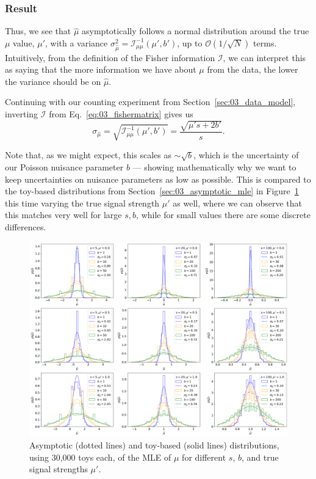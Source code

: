 \subsubsection{Result}
\label{sec:03_pmle_result}

Thus, we see that $\hat \mu$ asymptotically follows a normal distribution around the true $\mu$ value, $\mu'$, with a variance $\sigma_{\hat\mu}^2 = \mathcal I^{-1}_{\mu\mu}(\mu', b')$, up to $\mathcal O (1/\sqrt{N})$ terms.
Intuitively, from the definition of the Fisher information $\mathcal I$, we can interpret this as saying that the more information we have about $\mu$ from the data, the lower the variance should be on $\hat \mu$.

Continuing with our counting experiment from Section~\ref{sec:03_data_model}, inverting $\mathcal I$ from Eq.~\ref{eq:03_fishermatrix} gives us
\begin{equation}
    \sigma_{\hat\mu} = \sqrt{\mathcal I^{-1}_{\mu\mu}(\mu', b')} = \frac{\sqrt{\mu' s + 2b'}}{s}.
\label{eq:03_asymstd}
\end{equation}

Note that, as we might expect, this scales as $\sim \sqrt{b}$, which is the uncertainty of our Poisson nuisance parameter $b$ --- showing mathematically why we want to keep uncertainties on nuisance parameters as low as possible.
This is compared to the toy-based distributions from Section~\ref{sec:03_asymptotic_mle} in Figure~\ref{fig:03_p_mle_asym} this time varying the true signal strength $\mu'$ as well, where we can observe that this matches very well for large $s, b$, while for small values there are some discrete differences. 

\begin{figure}[htb]
\centering
\includegraphics[width=\textwidth]{figures/03-Stats/05-asymptotic-mle/4.png}
\caption{Asymptotic (dotted lines) and toy-based (solid lines) distributions, using 30,000 toys each, of the MLE of $\mu$ for different $s$, $b$, and true signal strengths $\mu'$.}
\label{fig:03_p_mle_asym}
\end{figure}

